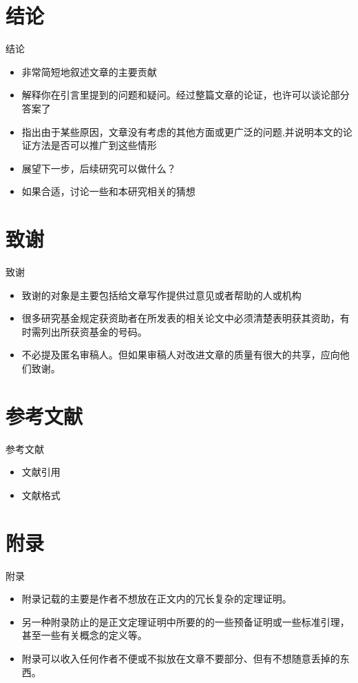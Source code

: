 \documentclass[13pt]{ctexbeamer}
\begin{document}
\section{结论}
\begin{frame}{结论}

	\begin{itemize}
		\item  非常简短地叙述文章的主要贡献
		\item  解释你在引言里提到的问题和疑问。经过整篇文章的论证，也许可以谈论部分答案了
		\item 指出由于某些原因，文章没有考虑的其他方面或更广泛的问题,并说明本文的论证方法是否可以推广到这些情形
		\item  展望下一步，后续研究可以做什么？
		\item 如果合适，讨论一些和本研究相关的猜想
	\end{itemize}
\end{frame}

\section{致谢}
\begin{frame}{致谢}

	\begin{itemize}
		\item  致谢的对象是主要包括给文章写作提供过意见或者帮助的人或机构
		\item  很多研究基金规定获资助者在所发表的\alert{相关}论文中必须清楚表明获其资助，有时需列出所获资基金的号码。
		\item 不必提及匿名审稿人。但如果审稿人对改进文章的质量有很大的共享，应向他们致谢。
	\end{itemize}
\end{frame}

\section{参考文献}
\begin{frame}{参考文献}

	\begin{itemize}
		\item  文献引用
		\item  文献格式
	\end{itemize}
\end{frame}

\section{附录}
\begin{frame}{附录}

	\begin{itemize}
		\item  附录记载的主要是作者不想放在正文内的冗长复杂的定理证明。
		\item  另一种附录防止的是正文定理证明中所要的的一些预备证明或一些标准引理，甚至一些有关概念的定义等。
		\item 附录可以收入任何作者不便或不拟放在文章不要部分、但有不想随意丢掉的东西。
	\end{itemize}
\end{frame}
\end{document}
